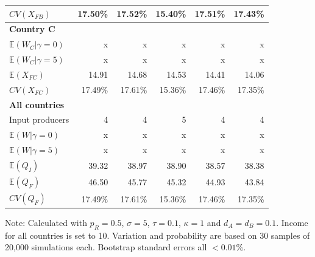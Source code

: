 \documentclass{article}
\begin{document}
\begin{table}
\begin{threeparttable}
\begin{tabular}{lrrrrr}
            $CV(X_{FB})$ & 17.50\% & 17.52\% & 15.40\% & 17.51\% & 17.43\% \\
            \midrule
            \textbf{Country C} \\
            $\mathbb{E}(W_C | \gamma = 0)$ & x & x & x & x & x \\
            $\mathbb{E}(W_C | \gamma = 5)$ & x & x & x & x & x \\
            $\mathbb{E}(X_{FC})$ & 14.91 & 14.68 & 14.53 & 14.41 & 14.06 \\
            $CV(X_{FC})$ & 17.49\% & 17.61\% & 15.36\% & 17.46\% & 17.35\% \\
            \midrule
            \textbf{All countries} \\
            Input producers & 4 & 4 & 5 & 4 & 4 \\
            $\mathbb{E}(W | \gamma = 0)$ & x & x & x & x & x \\
            $\mathbb{E}(W | \gamma = 5)$ & x & x & x & x & x \\
            $\mathbb{E}(Q_I)$ & 39.32 & 38.97 & 38.90 & 38.57 & 38.38 \\
            $\mathbb{E}(Q_F)$ & 46.50 & 45.77 & 45.32 & 44.93 & 43.84 \\
            $CV(Q_F)$ & 17.49\% & 17.61\% & 15.36\% & 17.46\% & 17.35\% \\
            \bottomrule
        \end{tabular}
        \begin{tablenotes}
            \small \item Note: Calculated with $p_R = 0.5$, $\sigma = 5$, $\tau = 0.1$, $\kappa = 1$ and $d_A = d_B = 0.1$. Income for all countries is set to 10. Variation and probability are based on 30 samples of 20,000 simulations each. Bootstrap standard errors all $<0.01\%$.
        \end{tablenotes}
    \end{threeparttable}
\end{table}
\end{document}
